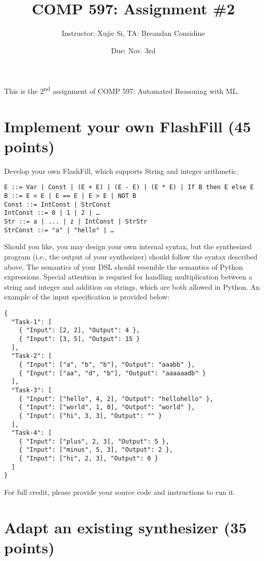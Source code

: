 \documentclass[11pt]{article}
\author{Instructor: Xujie Si, TA: Breandan Considine}
\date{Due: Nov. 3rd}
\title{COMP 597: Assignment \#2}
\begin{document}
    \maketitle
    \noindent This is the 2\textsuperscript{nd} assignment of COMP 597: Automated Reasoning with ML.

    \section{Implement your own FlashFill (45 points)}

    Develop your own FlashFill, which supports String and integer arithmetic.

    \begin{lstlisting}[basicstyle=\ttfamily\footnotesize]
E ::= Var | Const | (E + E) | (E - E) | (E * E) | If B then E else E
B ::= E < E | E == E | E > E | NOT B
Const ::= IntConst | StrConst
IntConst ::= 0 | 1 | 2 | …
Str ::= a | ... | z | IntConst | StrStr
StrConst ::= "a" | "hello" | …
    \end{lstlisting}

    \noindent Should you like, you may design your own internal syntax, but the synthesized program (i.e., the output of your synthesizer) should follow the syntax described above. The semantics of your DSL should resemble the semantics of Python expressions. Special attention is requried for handling multiplication between a string and integer and addition on strings, which are both allowed in Python. An example of the input specification is provided below:

    \begin{lstlisting}[basicstyle=\ttfamily\tiny]
{
  "Task-1": [
    { "Input": [2, 2], "Output": 4 },
    { "Input": [3, 5], "Output": 15 }
  ],
  "Task-2": [
    { "Input": ["a", "b", "b"], "Output": "aaabb" },
    { "Input": ["aa", "d", "b"], "Output": "aaaaaadb" }
  ],
  "Task-3": [
    { "Input": ["hello", 4, 2], "Output": "hellohello" },
    { "Input": ["world", 1, 0], "Output": "world" },
    { "Input": ["hi", 3, 3], "Output": "" }
  ],
  "Task-4": [
    { "Input": ["plus", 2, 3], "Output": 5 },
    { "Input": ["minus", 5, 3], "Output": 2 },
    { "Input": ["hi", 2, 3], "Output": 0 }
  ]
}
    \end{lstlisting}

    \noindent For full credit, please provide your source code and instructions to run it.

    \section{Adapt an existing synthesizer (35 points)}
\end{document}
